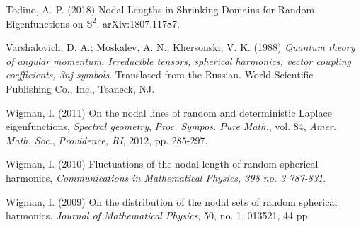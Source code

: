 \begin{thebibliography}{99}
	 Todino, A. P. (2018) Nodal Lengths in Shrinking Domains for Random Eigenfunctions on $\mathbb{S}^2$. arXiv:1807.11787.
	
	
	
	
	 Varshalovich, D. A.; Moskalev, A. N.; Khersonski,
	V. K. (1988) \textit{Quantum theory of angular momentum. Irreducible tensors,
		spherical harmonics, vector coupling coefficients, 3nj symbols}. Translated
	from the Russian. World Scientific Publishing Co., Inc., Teaneck, NJ.
	
	
	
	
	 Wigman, I. (2011) On the nodal lines of random and deterministic Laplace eigenfunctions, \textit{Spectral geometry}, \textit{Proc. Sympos. Pure Math.}, vol. 84, \textit{Amer. Math. Soc.}, \textit{Providence, RI}, 2012, pp. 285-297. 
	
	 Wigman, I. 	(2010) Fluctuations of the nodal length of random spherical
	harmonics, \textit{Communications in Mathematical Physics, 398 no. 3 787-831}.
	
	 Wigman, I. (2009) On the distribution of the nodal sets of random
	spherical harmonics. \textit{Journal of Mathematical Physics}, 50, no. 1,
	013521, 44 pp.
	
	
	
	
	
	
	
	
	
	

\end{thebibliography}
